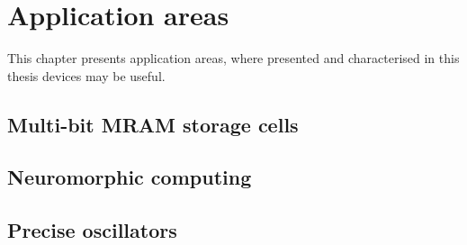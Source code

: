 \chapter{Application areas}
\label{sec:Fabrication}

This chapter presents application areas, where presented and characterised in this thesis devices may be useful.

\section{Multi-bit MRAM storage cells} \label{sec:MRAM}
\lipsum

\section{Neuromorphic computing} \label{sec:Neuromorphic}
\lipsum

\section{Precise oscillators} \label{sec:Oscillator}
\lipsum